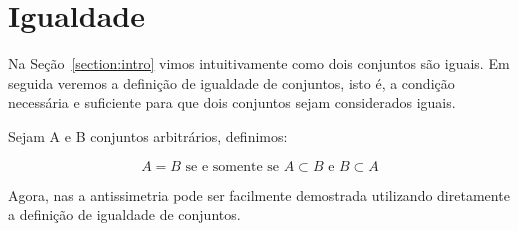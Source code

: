 \section{Igualdade}

Na Seção~\ref{section:intro} vimos intuitivamente como dois conjuntos são iguais. Em seguida veremos a definição de igualdade de conjuntos, isto é, a condição necessária e suficiente para que dois conjuntos sejam considerados iguais.

\begin{definition}
Sejam A e B conjuntos arbitrários, definimos:

	$$ A = B \text{ se e somente se } A \subset B \text{ e } B \subset A $$

\end{definition}

\begin{remark}
	Agora, nas  a antissimetria pode ser facilmente demostrada utilizando diretamente a definição de igualdade de conjuntos.
\end{remark}

